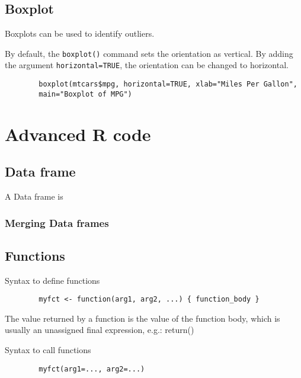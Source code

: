 \documentclass[a4paper,12pt]{article}
\begin{document}
\begin{itemize}
		
	
	\section{Boxplot}
	Boxplots can be used to identify outliers.
	
	By default, the \texttt{boxplot()} command sets the orientation as vertical. By adding the argument \texttt{horizontal=TRUE}, the orientation can be changed to horizontal.
	\large
	\begin{framed}
		\begin{verbatim}
		boxplot(mtcars$mpg, horizontal=TRUE, xlab="Miles Per Gallon",
		main="Boxplot of MPG")
		\end{verbatim}
	\end{framed}
	
	
	
	
	\newpage
	\chapter{Advanced R code}
	\section{Data frame}
	A Data frame is
	\subsection{Merging Data frames}
	
	\section{Functions}
	Syntax to define functions
	
	\begin{framed}
		\begin{verbatim}
		myfct <- function(arg1, arg2, ...) { function_body }
		\end{verbatim}
	\end{framed}
	The value returned by a function is the value of the function body, which is usually an unassigned final expression, e.g.: return()
	
	Syntax to call functions
	\begin{framed}
		\begin{verbatim}
		myfct(arg1=..., arg2=...)
		\end{verbatim}
	\end{framed}
	

\end{itemize}
\end{document}
